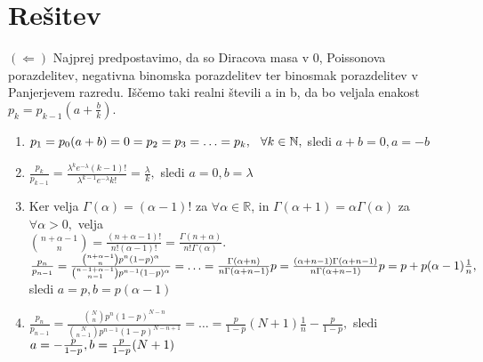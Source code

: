 \documentclass[a4paper]{article}
\begin{document}
\section{Rešitev}
$(\Leftarrow)$ Najprej predpostavimo, da so Diracova masa v 0, Poissonova porazdelitev, negativna binomska porazdelitev ter binosmak porazdelitev v Panjerjevem razredu. Iščemo taki realni števili a in b, da bo veljala enakost $p_k = p_{k-1}(a + \frac{b}{k}).$
\begin{enumerate}
	\item{$p_1=p_0(a + b) = 0 = p_2 = p_3 = \ldots = p_k, \hspace{0.25cm} \forall k \in \mathbb{N},$ sledi $a + b = 0, a=-b$}
	\item{$\frac{p_k}{p_{k-1}}=\frac{\lambda^k e^{-\lambda}(k-1)!}{\lambda^{k-1} e^{-\lambda}k!} = \frac{\lambda}{k}, $ sledi $ a = 0, b = \lambda$} 
	\item{Ker velja $\Gamma(\alpha)=(\alpha-1)!$  za $\forall \alpha \in \mathbb{R}$, in $\Gamma(\alpha+1)=\alpha\Gamma(\alpha)$ za $\forall \alpha > 0,$ velja \\[1.5mm] ${n +\alpha - 1 \choose n} = \frac{(n+\alpha-1)!}{n!(\alpha-1)!}=\frac{\Gamma(n+\alpha)}{n!\Gamma(\alpha)}.$ \\[1.5mm] $\frac{p_n}{p_{n-1}}=\frac{\binom{n + \alpha - 1}{n}p^n(1-p)^{\alpha}}{\binom{n-1+\alpha-1}{n-1}p^{n-1}(1-p)^\alpha}=\ldots=\frac{\Gamma(\alpha+n)}{n\Gamma(\alpha+n-1)}p=\frac{(\alpha+n-1)\Gamma(\alpha+n-1)}{n\Gamma(\alpha+n-1)}p= \\[1.5mm] p+p(\alpha-1)\frac{1}{n}, $ sledi $ a=p, b=p(\alpha-1)$}
	\item{$\frac{p_n}{p_{n-1}}=\frac{\binom{N}{n}p^n(1-p)^{N-n}}{\binom{N}{n-1}p^{n-1}(1-p)^{N-n+1}}=\ldots=\frac{p}{1-p}(N+1)\frac{1}{n}-\frac{p}{1-p}, $ sledi $ a= \\[1.5mm] -\frac{p}{1-p}, b = \frac{p}{1-p}(N+1)$}
\end{enumerate}
\end{document}
